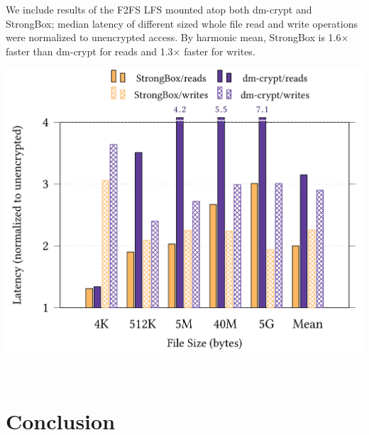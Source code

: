 \documentclass[a0,portrait]{a0poster}
\newcommand{\PAD}{\vskip 0.75cm}
\begin{document}
\begin{multicols}{2}
We include results of the F2FS LFS mounted atop both dm-crypt and StrongBox;
median latency of different sized whole file read and write operations were
normalized to unencrypted access. By harmonic mean, StrongBox is 1.6$\times$
faster than dm-crypt for reads and 1.3$\times$ faster for writes.

\begin{minipage}{\columnwidth}
\PAD 
\centering
\includegraphics[scale=0.45]{first_bars}
\label{fig:microbench-f2fs-sequential}
\PAD 
\end{minipage}\\[1ex]
\begin{minipage}{\columnwidth}
\PAD 
\end{minipage}


\color{SaddleBrown} %

\section*{Conclusion}

\begin{itemize}


\end{itemize}
\end{multicols}
\end{document}
